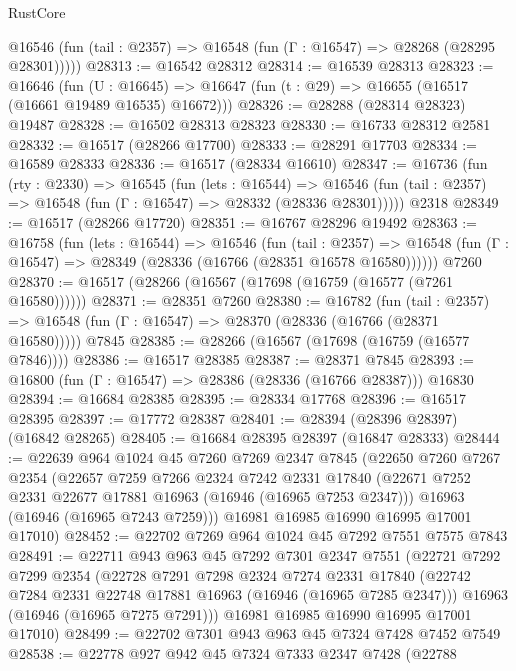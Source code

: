 \begin{lexlean}{RustCore}
\begin{coremodule}
      @16546 (fun (tail : @2357) => @16548 (fun (Γ : @16547) => @28268 (@28295 @28301)))))
@28313 := @16542 @28312
@28314 := @16539 @28313
@28323 := @16646
    (fun (U : @16645) => @16647 (fun (t : @29) => @16655 (@16517 (@16661 @19489 @16535) @16672)))
@28326 := @28288 (@28314 @28323) @19487
@28328 := @16502 @28313 @28323
@28330 := @16733 @28312 @2581
@28332 := @16517 (@28266 @17700)
@28333 := @28291 @17703
@28334 := @16589 @28333
@28336 := @16517 (@28334 @16610)
@28347 := @16736
    (fun (rty : @2330) =>
    @16545
      (fun (lets : @16544) =>
      @16546 (fun (tail : @2357) => @16548 (fun (Γ : @16547) => @28332 (@28336 @28301)))))
    @2318
@28349 := @16517 (@28266 @17720)
@28351 := @16767 @28296 @19492
@28363 := @16758
    (fun (lets : @16544) =>
    @16546
      (fun (tail : @2357) =>
      @16548 (fun (Γ : @16547) => @28349 (@28336 (@16766 (@28351 @16578 @16580))))))
    @7260
@28370 := @16517 (@28266 (@16567 (@17698 (@16759 (@16577 (@7261 @16580))))))
@28371 := @28351 @7260
@28380 := @16782
    (fun (tail : @2357) => @16548 (fun (Γ : @16547) => @28370 (@28336 (@16766 (@28371 @16580)))))
    @7845
@28385 := @28266 (@16567 (@17698 (@16759 (@16577 @7846))))
@28386 := @16517 @28385
@28387 := @28371 @7845
@28393 := @16800 (fun (Γ : @16547) => @28386 (@28336 (@16766 @28387))) @16830
@28394 := @16684 @28385
@28395 := @28334 @17768
@28396 := @16517 @28395
@28397 := @17772 @28387
@28401 := @28394 (@28396 @28397) (@16842 @28265)
@28405 := @16684 @28395 @28397 (@16847 @28333)
@28444 := @22639
    @964
    @1024
    @45
    @7260
    @7269
    @2347
    @7845
    (@22650
      @7260
      @7267
      @2354
      (@22657
        @7259
        @7266
        @2324
        @7242
        @2331
        @17840
        (@22671 @7252 @2331 @22677 @17881 @16963 (@16946 (@16965 @7253 @2347)))
        @16963
        (@16946 (@16965 @7243 @7259)))
      @16981
      @16985
      @16990
      @16995
      @17001
      @17010)
@28452 := @22702 @7269 @964 @1024 @45 @7292 @7551 @7575 @7843
@28491 := @22711
    @943
    @963
    @45
    @7292
    @7301
    @2347
    @7551
    (@22721
      @7292
      @7299
      @2354
      (@22728
        @7291
        @7298
        @2324
        @7274
        @2331
        @17840
        (@22742 @7284 @2331 @22748 @17881 @16963 (@16946 (@16965 @7285 @2347)))
        @16963
        (@16946 (@16965 @7275 @7291)))
      @16981
      @16985
      @16990
      @16995
      @17001
      @17010)
@28499 := @22702 @7301 @943 @963 @45 @7324 @7428 @7452 @7549
@28538 := @22778
    @927
    @942
    @45
    @7324
    @7333
    @2347
    @7428
    (@22788

\end{coremodule}
\end{lexlean}
